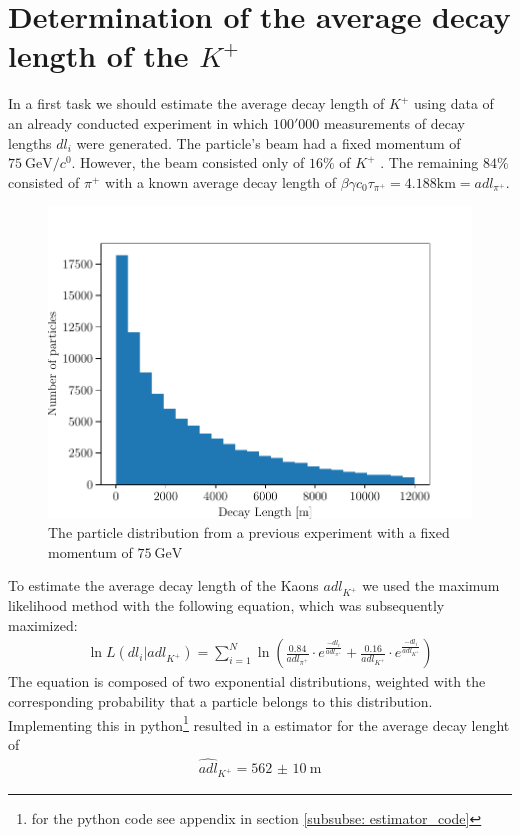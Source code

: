 \documentclass[12pt,a4paper,oneside,english]{article}
\begin{document}
\section{Determination of the average decay length of the $K^+$}
In a first task we should estimate the average decay length of $K^+$ using data of an already conducted experiment in which $100'000$ measurements
of decay lengths $dl_i$ were generated. The particle's beam had a fixed momentum of $\SI{75}{\giga\electronvolt\per\clight}$. However, the beam consisted only of $16\%$ of
$K^+$ . The remaining $84\%$ consisted of $\pi^+$ with a known average decay length of $\beta \gamma c_0 \tau_{\pi^+} = 4.188 \si{\kilo\meter} =
adl_{\pi^+}$.
\begin{figure}[H]
\centering
\includegraphics[width=0.8\linewidth]{images/histogram_decay_length.pdf}
	\caption{The particle distribution from a previous experiment with a fixed momentum of $\SI{75}{\giga\electronvolt}$}
	\label{fig:decay}
\end{figure}
To estimate the average decay length of the Kaons $adl_{K^+}$ we used the maximum likelihood method with
the following equation, which was subsequently maximized:
\begin{align}
\ln L(dl_i|adl_{K^+}) = \sum_{i=1}^{N}\ln\left(\frac{0.84}{adl_{\pi^+}}\cdot e^{\frac{-dl_i}{adl_{\pi^+}}}+\frac{0.16}{adl_{K^+}}\cdot e^{\frac{-dl_i}{adl_{K^+}}}\right)
\end{align}
The equation is composed of two exponential distributions, weighted with the corresponding probability that a particle belongs to this distribution. Implementing this in python\footnote{for the python code see appendix in section \ref{subsubse: estimator_code} } resulted in a estimator for the average decay lenght of
\begin{align}
\widehat{adl}_{K^+} = \SI{562(10)}{\meter}
\end{align}
\end{document}
